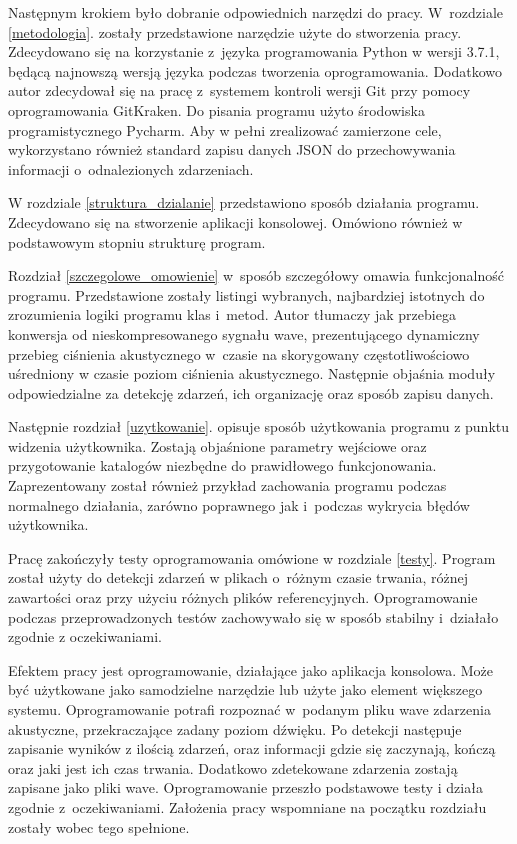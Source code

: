 \documentclass[eng,printmode]{mgr}
\begin{document}
Następnym krokiem było dobranie odpowiednich narzędzi do pracy. W~rozdziale \ref{metodologia}. zostały przedstawione narzędzie użyte do stworzenia pracy. Zdecydowano się na korzystanie z~języka programowania Python w wersji 3.7.1, będącą najnowszą wersją języka podczas tworzenia oprogramowania. Dodatkowo autor zdecydował się na pracę z~systemem kontroli wersji Git przy pomocy oprogramowania GitKraken. Do pisania programu użyto środowiska programistycznego Pycharm. Aby w pełni zrealizować zamierzone cele, wykorzystano również standard zapisu danych JSON do przechowywania informacji o~odnalezionych zdarzeniach. 

W rozdziale \ref{struktura_dzialanie} przedstawiono sposób działania programu. Zdecydowano się na stworzenie aplikacji konsolowej. Omówiono również w podstawowym stopniu strukturę program.
 

Rozdział \ref{szczegolowe_omowienie} w~sposób szczegółowy omawia funkcjonalność programu. Przedstawione zostały listingi wybranych, najbardziej istotnych do zrozumienia logiki programu klas i~metod. Autor tłumaczy jak przebiega konwersja od nieskompresowanego sygnału wave, prezentującego dynamiczny przebieg ciśnienia akustycznego w~czasie na skorygowany częstotliwościowo uśredniony w czasie poziom ciśnienia akustycznego. Następnie objaśnia moduły odpowiedzialne za detekcję zdarzeń, ich organizację oraz sposób zapisu danych. 

Następnie rozdział \ref{uzytkowanie}. opisuje sposób użytkowania programu z punktu widzenia użytkownika. Zostają objaśnione parametry wejściowe oraz przygotowanie katalogów niezbędne do prawidłowego funkcjonowania. Zaprezentowany został również przykład zachowania programu podczas normalnego działania, zarówno poprawnego jak i~podczas wykrycia błędów użytkownika. 

Pracę zakończyły testy oprogramowania omówione w rozdziale \ref{testy}. Program został użyty do detekcji zdarzeń w plikach o~różnym czasie trwania, różnej zawartości oraz przy użyciu różnych plików referencyjnych. Oprogramowanie podczas przeprowadzonych testów zachowywało się w sposób stabilny i~działało zgodnie z oczekiwaniami. 

Efektem pracy jest oprogramowanie, działające jako aplikacja konsolowa. Może być użytkowane jako samodzielne narzędzie lub użyte jako element większego systemu. Oprogramowanie potrafi rozpoznać w~podanym pliku wave zdarzenia akustyczne, przekraczające zadany poziom dźwięku. Po detekcji następuje zapisanie wyników z ilością zdarzeń, oraz informacji gdzie się zaczynają, kończą oraz jaki jest ich czas trwania. Dodatkowo zdetekowane zdarzenia zostają zapisane jako pliki wave. Oprogramowanie przeszło podstawowe testy i działa zgodnie z~oczekiwaniami. Założenia pracy wspomniane na początku rozdziału zostały wobec tego spełnione.
\end{document}
